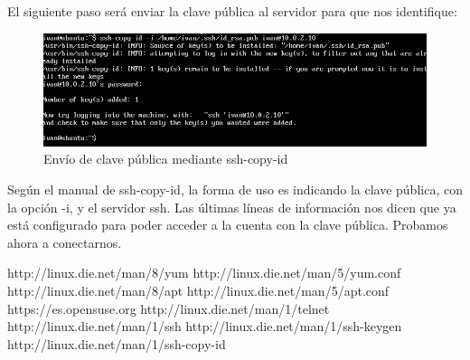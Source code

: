 El siguiente paso será enviar la clave pública al servidor para que nos identifique:

\begin{figure}[H]
	\centering
	\includegraphics[width=0.7\linewidth]{ssh-copy-id}
	\caption[Uso de copy-id]{Envío de clave pública mediante ssh-copy-id}
	\label{fig:ssh-copy-id}
\end{figure}
 
Según el manual de ssh-copy-id\cite{copy-id}, la forma de uso es indicando la clave pública, con la opción -i, y el servidor ssh. Las últimas líneas de información nos dicen que ya está configurado para poder acceder a la cuenta con la clave pública. Probamos ahora a conectarnos.



 


\newpage
\begin{thebibliography}{xx}
	 http://linux.die.net/man/8/yum
	 http://linux.die.net/man/5/yum.conf
	 http://linux.die.net/man/8/apt
	 http://linux.die.net/man/5/apt.conf
	 https://es.opensuse.org
	 http://linux.die.net/man/1/telnet
	 http://linux.die.net/man/1/ssh
	 http://linux.die.net/man/1/ssh-keygen
	 http://linux.die.net/man/1/ssh-copy-id
	
\end{thebibliography}
